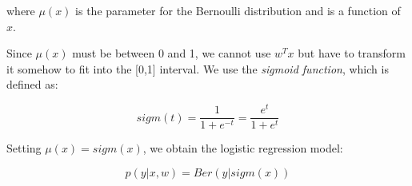 \documentclass[11pt,letterpaper]{article}
\theoremstyle{definition}
\begin{document}
where $\mu(x)$ is the parameter for the Bernoulli distribution and is a function of $x$.

Since $\mu(x)$ must be between 0 and 1, we cannot use $w^{T}x$ but have to transform it somehow to fit into the [0,1] interval. We use the \emph{sigmoid function}, which is defined as:

\begin{equation}
sigm(t) = \frac{1}{1 + e^{-t}} = \frac{e^t}{1 + e^t}
\end{equation} 

Setting $\mu(x) = sigm(x)$, we obtain the logistic regression model:

\begin{equation}
p(y | x, w) = Ber(y | sigm(x))
\end{equation}
\end{document}
